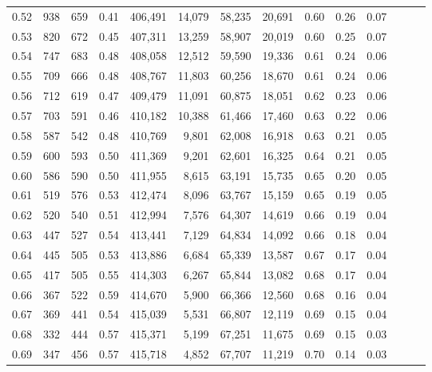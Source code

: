 \begin{tabular}{rrrrrrrrrrrrrr}
0.52 &     938 &    659 &  0.41 &  406,491 &   14,079 &  58,235 &  20,691 &  0.60 &  0.26 &      0.07 \\
0.53 &     820 &    672 &  0.45 &  407,311 &   13,259 &  58,907 &  20,019 &  0.60 &  0.25 &      0.07 \\
0.54 &     747 &    683 &  0.48 &  408,058 &   12,512 &  59,590 &  19,336 &  0.61 &  0.24 &      0.06 \\
0.55 &     709 &    666 &  0.48 &  408,767 &   11,803 &  60,256 &  18,670 &  0.61 &  0.24 &      0.06 \\
0.56 &     712 &    619 &  0.47 &  409,479 &   11,091 &  60,875 &  18,051 &  0.62 &  0.23 &      0.06 \\
0.57 &     703 &    591 &  0.46 &  410,182 &   10,388 &  61,466 &  17,460 &  0.63 &  0.22 &      0.06 \\
0.58 &     587 &    542 &  0.48 &  410,769 &    9,801 &  62,008 &  16,918 &  0.63 &  0.21 &      0.05 \\
0.59 &     600 &    593 &  0.50 &  411,369 &    9,201 &  62,601 &  16,325 &  0.64 &  0.21 &      0.05 \\
0.60 &     586 &    590 &  0.50 &  411,955 &    8,615 &  63,191 &  15,735 &  0.65 &  0.20 &      0.05 \\
0.61 &     519 &    576 &  0.53 &  412,474 &    8,096 &  63,767 &  15,159 &  0.65 &  0.19 &      0.05 \\
0.62 &     520 &    540 &  0.51 &  412,994 &    7,576 &  64,307 &  14,619 &  0.66 &  0.19 &      0.04 \\
0.63 &     447 &    527 &  0.54 &  413,441 &    7,129 &  64,834 &  14,092 &  0.66 &  0.18 &      0.04 \\
0.64 &     445 &    505 &  0.53 &  413,886 &    6,684 &  65,339 &  13,587 &  0.67 &  0.17 &      0.04 \\
0.65 &     417 &    505 &  0.55 &  414,303 &    6,267 &  65,844 &  13,082 &  0.68 &  0.17 &      0.04 \\
0.66 &     367 &    522 &  0.59 &  414,670 &    5,900 &  66,366 &  12,560 &  0.68 &  0.16 &      0.04 \\
0.67 &     369 &    441 &  0.54 &  415,039 &    5,531 &  66,807 &  12,119 &  0.69 &  0.15 &      0.04 \\
0.68 &     332 &    444 &  0.57 &  415,371 &    5,199 &  67,251 &  11,675 &  0.69 &  0.15 &      0.03 \\
0.69 &     347 &    456 &  0.57 &  415,718 &    4,852 &  67,707 &  11,219 &  0.70 &  0.14 &      0.03 \\

\end{tabular}

